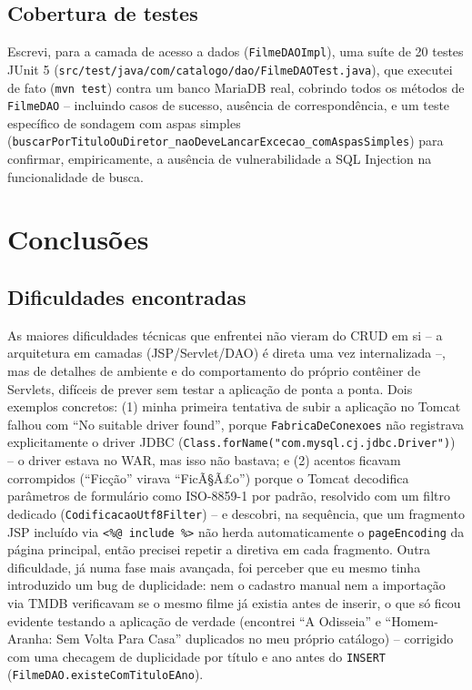 \documentclass[12pt,a4paper]{article}
\begin{document}
\subsection{Cobertura de testes}

Escrevi, para a camada de acesso a dados (\texttt{FilmeDAOImpl}), uma suíte de 20 testes JUnit 5
(\texttt{src/test/java/com/catalogo/dao/FilmeDAOTest.java}), que executei de fato (\texttt{mvn
test}) contra um banco MariaDB real, cobrindo todos os métodos de \texttt{FilmeDAO} -- incluindo
casos de sucesso, ausência de correspondência, e um teste específico de sondagem com aspas
simples (\texttt{buscarPorTituloOuDiretor\_naoDeveLancarExcecao\_comAspasSimples}) para
confirmar, empiricamente, a ausência de vulnerabilidade a SQL Injection na funcionalidade de
busca.

\section{Conclusões}

\subsection{Dificuldades encontradas}

As maiores dificuldades técnicas que enfrentei não vieram do CRUD em si -- a arquitetura em
camadas (JSP/Servlet/DAO) é direta uma vez internalizada --, mas de detalhes de ambiente e do
comportamento do próprio contêiner de Servlets, difíceis de prever sem testar a aplicação de
ponta a ponta. Dois exemplos concretos: (1) minha primeira tentativa de subir a aplicação no
Tomcat falhou com ``No suitable driver found'', porque \texttt{FabricaDeConexoes} não registrava
explicitamente o driver JDBC (\texttt{Class.forName("com.mysql.cj.jdbc.Driver")}) -- o driver
estava no WAR, mas isso não bastava; e (2) acentos ficavam corrompidos (``Ficção'' virava
``FicÃ§Ã£o'') porque o Tomcat decodifica parâmetros de formulário como ISO-8859-1 por padrão,
resolvido com um filtro dedicado (\texttt{CodificacaoUtf8Filter}) -- e descobri, na sequência,
que um fragmento JSP incluído via \texttt{<\%@ include \%>} não herda automaticamente o
\texttt{pageEncoding} da página principal, então precisei repetir a diretiva em cada fragmento.
Outra dificuldade, já numa fase mais avançada, foi perceber que eu mesmo tinha introduzido um
bug de duplicidade: nem o cadastro manual nem a importação via TMDB verificavam se o mesmo filme
já existia antes de inserir, o que só ficou evidente testando a aplicação de verdade (encontrei
``A Odisseia'' e ``Homem-Aranha: Sem Volta Para Casa'' duplicados no meu próprio catálogo) --
corrigido com uma checagem de duplicidade por título e ano antes do \texttt{INSERT}
(\texttt{FilmeDAO.existeComTituloEAno}).
\end{document}
